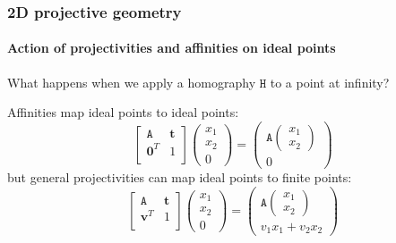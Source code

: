 \documentclass[aspectratio=169]{beamer}
\renewcommand{\vec}[1]{\boldsymbol{#1}}
\newcommand{\mat}[1]{\mathtt{#1}}
\begin{document}
\begin{frame}
\frametitle{2D projective geometry}
\framesubtitle{Action of projectivities and affinities on ideal points}

What happens when we apply a homography $\mat{H}$ to a point at
infinity?

\medskip

Affinities map ideal points to ideal points:
\begin{equation*}
\begin{bmatrix}
\mat{A} & \vec{t} \\
\vec{0}^T & 1 \\
\end{bmatrix}
\begin{pmatrix}
x_1 \\ x_2 \\ 0
\end{pmatrix}
=
\begin{pmatrix}
\mat{A} \begin{pmatrix} x_1 \\ x_2 \end{pmatrix}\\
0
\end{pmatrix}
\end{equation*}
but general projectivities can map ideal points to finite points:
\begin{equation*}
\begin{bmatrix}
\mat{A} & \vec{t} \\
\vec{v}^T & 1 \\
\end{bmatrix}
\begin{pmatrix}
x_1 \\ x_2 \\ 0
\end{pmatrix}
=
\begin{pmatrix}
\mat{A} \begin{pmatrix} x_1 \\ x_2 \end{pmatrix}\\
v_1 x_1 + v_2 x_2
\end{pmatrix}
\end{equation*}

\end{frame}
\end{document}
